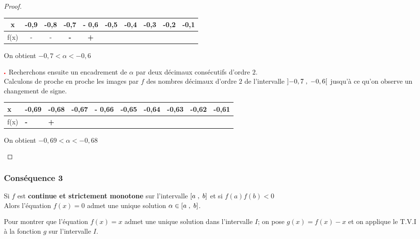 \begin{example}
\begin{proof}
\begin{enumerate}
\renewcommand{\arraystretch}{1}
\begin{tabular}{|*{10}{c|}}
\hline 
x &-0,9  &-0,8 & -0,7 &- 0,6 & -0,5 & -0,4 &-0,3 &-0,2& -0,1  \\
\hline
f(x) &-  & -  & \textbf{\color{red} -} & \textbf{\color{red} +}  & \color{green} &  &  &  &  \\
\hline
\end{tabular}
\vspace{0.5cm}   On obtient $-0,7<\alpha< - 0,6  $


$ \color{red}\centerdot $ Recherchons ensuite  un encadrement de $ \alpha $ par deux décimaux consécutifs d'ordre $ 2. $\\
Calculons de proche en proche les images par $ f $  des nombres décimaux d'ordre $ 2 $ de l'intervalle $ \left]-0,7 \;,\; -0,6\right[ $ jusqu'à ce qu'on observe un changement de signe.

\begin{center}
\begin{tabularx}{\textwidth}{|X|X|X|X|X|X|X|X|X|X|}
\hline 
x &-0,69  &-0,68 & -0,67 &- 0,66 & -0,65 & -0,64 &-0,63 &-0,62& -0,61  \\
\hline
f(x) &\textbf{\color{red} -} & \textbf{\color{red} +}  &  &   & \color{green} &  &  &  &  \\
\hline
\end{tabularx}

\vspace{0.5cm}   On obtient $-0,69<\alpha< - 0,68  $

\end{center}
\end{enumerate}
  \end{proof}
  \subsubsection*{Conséquence 3}
  
 Si $ f $ est \textbf{\color{magenta}continue et strictement monotone} sur  l'intervalle $ \left[a\;,\; b\right] $ et si \colorbox{green!20!}{$ f(a)f(b) < 0 $ }\\
Alors l'équation $ f(x)=0 $ admet une  unique  solution $ \alpha \in \left[a\;,\; b\right] $.

\begin{remark}
Pour montrer que l'équation $ f(x)=x $ admet une  unique  solution dans l'intervalle $I$; on pose $ g(x)=f(x)-x $ et on applique le T.V.I à la fonction $ g $ sur l'intervalle $I$.
\end{remark}


\end{example}
